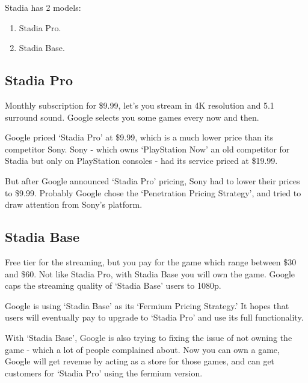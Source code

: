 Stadia has 2 models:
\begin{enumerate}
    \item Stadia Pro.
    \item Stadia Base.
\end{enumerate}

\subsection{Stadia Pro}
Monthly subscription for \$9.99, let's you stream in 4K resolution and 5.1 surround sound.
Google selects you some games every now and then. \cite{stadiaPro}

Google priced `Stadia Pro' at \$9.99, which is a much lower price than its competitor Sony.
Sony - which owns `PlayStation Now' an old competitor for Stadia but only on PlayStation consoles - had its service priced at \$19.99. \cite{sonyPrices}

But after Google announced `Stadia Pro' pricing, Sony had to lower their prices to \$9.99.
Probably Google chose the `Penetration Pricing Strategy', and tried to draw attention from Sony's platform. \cite{pricingStategy}

\subsection{Stadia Base}
Free tier for the streaming, but you pay for the game which range between \$30 and \$60.
Not like Stadia Pro, with Stadia Base you will own the game.
Google caps the streaming quality of `Stadia Base' users to 1080p. \cite{stadiaBase}

Google is using `Stadia Base' as its `Fermium Pricing Strategy.'
It hopes that users will eventually pay to upgrade to `Stadia Pro' and use its full functionality.

With `Stadia Base', Google is also trying to fixing the issue of not owning the game - which a lot of people complained about.
Now you can own a game, Google will get revenue by acting as a store for those games, and can get customers for `Stadia Pro' using the fermium version.